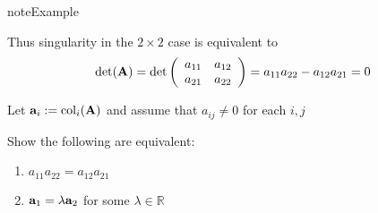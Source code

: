 \documentclass[letterpaper,10pt,english]{jupyterBook}
\begin{document}
\begin{sphinxadmonition}{note}{Example}

\sphinxAtStartPar
Thus singularity in the \(2 \times 2\) case is equivalent to
\begin{equation*}
\begin{split}
%
\det({\bf A})
=
\det 
\left(
\begin{array}{cc}
a_{11} & a_{12} \\
a_{21} & a_{22} \\
\end{array}
\right)
= a_{11}a_{22} - a_{12} a_{21} = 0
%
\end{split}
\end{equation*}\end{sphinxadmonition}

\sphinxAtStartPar
{} Let \({\bf a}_i := \mathrm{col}_i({\bf A})\) and assume that \(a_{ij} \ne 0\) for each \(i, j\)

\sphinxAtStartPar
Show the following are equivalent:
\begin{enumerate}
%
\item {} 
\sphinxAtStartPar
\(a_{11}a_{22} = a_{12} a_{21}\)

\item {} 
\sphinxAtStartPar
\({\bf a}_1 = \lambda {\bf a}_2\) for some \(\lambda \in \mathbb{R}\)

\end{enumerate}
\end{document}
